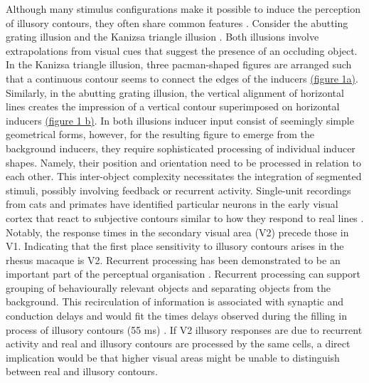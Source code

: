 \documentclass[12pt]{article}
\begin{document}
\bigbreak
Although many stimulus configurations make it possible to induce the perception of illusory contours, they often share common features \autocite{palmerLateInfluencesPerceptual2000}. Consider the abutting grating illusion \autocite{sorianoAbuttingGratingIllusion1996} and the Kanizsa triangle illusion \autocite{kanizsaSubjectiveContours1976}. Both illusions involve extrapolations from visual cues that suggest the presence of an occluding object. In the Kanizsa triangle illusion, three pacman-shaped figures are arranged such that a continuous contour seems to connect the edges of the inducers \hyperref[fig:figure_1]{(figure 1a)}. Similarly, in the abutting grating illusion, the vertical alignment of horizontal lines creates the impression of a vertical contour superimposed on horizontal inducers \hyperref[fig:figure_1]{(figure 1 b)}. In both illusions inducer input consist of seemingly simple geometrical forms, however, for the resulting figure to emerge from the background inducers, they require sophisticated processing of individual inducer shapes. Namely, their position and orientation need to be processed in relation to each other. This inter-object complexity necessitates the integration of segmented stimuli, possibly involving feedback or recurrent activity. Single-unit recordings from cats and primates have identified particular neurons in the early visual cortex that react to subjective contours similar to how they respond to real lines \autocite{leeDynamicsSubjectiveContour2001,vonderheydtMechanismsContourPerception1989}. Notably, the response times in the secondary visual area (V2) precede those in V1. Indicating that the first place sensitivity to illusory contours arises in the rhesus macaque is V2. Recurrent processing has been demonstrated to be an important part of the perceptual organisation \autocite{roelfsemaCORTICALALGORITHMSPERCEPTUAL2006}. Recurrent processing can support grouping of behaviourally relevant objects and separating objects from the background. This recirculation of information is associated with synaptic and conduction delays and would fit the times delays observed during the filling in process of illusory contours (55 ms) \autocite{leeDynamicsSubjectiveContour2001,pakTopDownFeedbackControls2020}. If V2 illusory responses are due to recurrent activity and real and illusory contours are processed by the same cells, a direct implication would be that higher visual areas might be unable to distinguish between real and illusory contours.
\end{document}
